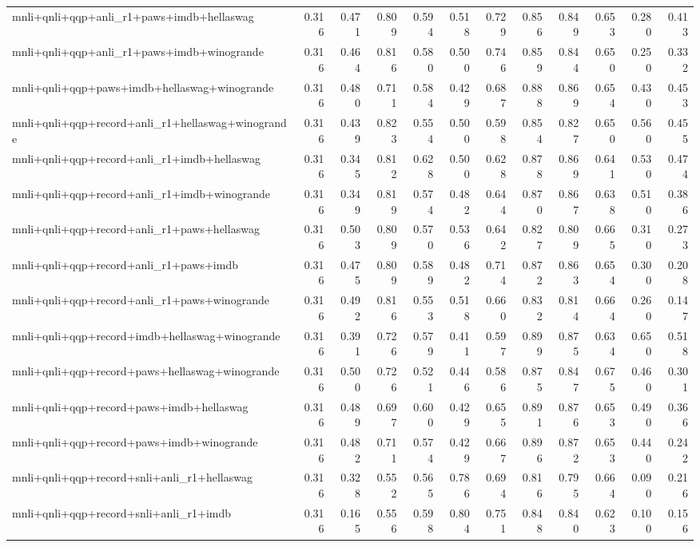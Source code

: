 \begin{table}[t]
\begin{tabular}{lrrrrrrrrrrr}
    mnli+qnli+qqp+anli\_r1+paws+imdb+hellaswag & 0.316 & 0.471 & 0.809 & 0.594 & 0.518 & 0.729 & 0.856 & 0.849 & 0.653 & 0.280 & 0.413 \\
    mnli+qnli+qqp+anli\_r1+paws+imdb+winogrande & 0.316 & 0.464 & 0.816 & 0.580 & 0.500 & 0.746 & 0.859 & 0.844 & 0.650 & 0.250 & 0.332 \\
    mnli+qnli+qqp+paws+imdb+hellaswag+winogrande & 0.316 & 0.480 & 0.711 & 0.584 & 0.429 & 0.687 & 0.888 & 0.869 & 0.654 & 0.430 & 0.453 \\
    mnli+qnli+qqp+record+anli\_r1+hellaswag+winogrande & 0.316 & 0.439 & 0.823 & 0.554 & 0.500 & 0.598 & 0.854 & 0.827 & 0.650 & 0.560 & 0.455 \\
    mnli+qnli+qqp+record+anli\_r1+imdb+hellaswag & 0.316 & 0.345 & 0.812 & 0.628 & 0.500 & 0.628 & 0.878 & 0.869 & 0.641 & 0.530 & 0.474 \\
    mnli+qnli+qqp+record+anli\_r1+imdb+winogrande & 0.316 & 0.349 & 0.819 & 0.574 & 0.482 & 0.644 & 0.870 & 0.867 & 0.638 & 0.510 & 0.386 \\
    mnli+qnli+qqp+record+anli\_r1+paws+hellaswag & 0.316 & 0.503 & 0.809 & 0.570 & 0.536 & 0.642 & 0.827 & 0.809 & 0.665 & 0.310 & 0.273 \\
    mnli+qnli+qqp+record+anli\_r1+paws+imdb & 0.316 & 0.475 & 0.809 & 0.589 & 0.482 & 0.714 & 0.872 & 0.863 & 0.654 & 0.300 & 0.208 \\
    mnli+qnli+qqp+record+anli\_r1+paws+winogrande & 0.316 & 0.492 & 0.816 & 0.553 & 0.518 & 0.660 & 0.832 & 0.814 & 0.664 & 0.260 & 0.147 \\
    mnli+qnli+qqp+record+imdb+hellaswag+winogrande & 0.316 & 0.391 & 0.726 & 0.579 & 0.411 & 0.597 & 0.899 & 0.875 & 0.634 & 0.650 & 0.518 \\
    mnli+qnli+qqp+record+paws+hellaswag+winogrande & 0.316 & 0.500 & 0.726 & 0.521 & 0.446 & 0.586 & 0.875 & 0.847 & 0.675 & 0.460 & 0.301 \\
    mnli+qnli+qqp+record+paws+imdb+hellaswag & 0.316 & 0.489 & 0.697 & 0.600 & 0.429 & 0.655 & 0.891 & 0.876 & 0.653 & 0.490 & 0.366 \\
    mnli+qnli+qqp+record+paws+imdb+winogrande & 0.316 & 0.482 & 0.711 & 0.574 & 0.429 & 0.667 & 0.896 & 0.872 & 0.653 & 0.440 & 0.242 \\
    mnli+qnli+qqp+record+snli+anli\_r1+hellaswag & 0.316 & 0.328 & 0.552 & 0.565 & 0.786 & 0.694 & 0.816 & 0.795 & 0.664 & 0.090 & 0.216 \\
    mnli+qnli+qqp+record+snli+anli\_r1+imdb & 0.316 & 0.165 & 0.556 & 0.598 & 0.804 & 0.751 & 0.848 & 0.840 & 0.623 & 0.100 & 0.156 \\

\end{tabular}
\end{table}
